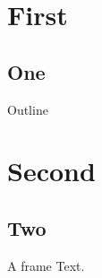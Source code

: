 \documentclass{beamer}
\begin{document}
\section{First}
\subsection{One}
\begin{frame}{Outline}
\tableofcontents[currentsection]
\end{frame}
\section{Second}
\subsection{Two}
\begin{frame}{A frame}
Text.
\end{frame}
\end{document}
